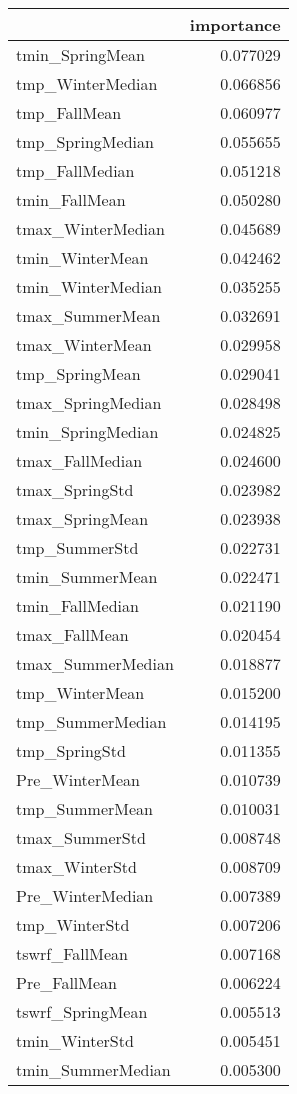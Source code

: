 \begin{tabular}{lr}
\toprule
 & importance \\
\midrule
tmin_SpringMean & 0.077029 \\
tmp_WinterMedian & 0.066856 \\
tmp_FallMean & 0.060977 \\
tmp_SpringMedian & 0.055655 \\
tmp_FallMedian & 0.051218 \\
tmin_FallMean & 0.050280 \\
tmax_WinterMedian & 0.045689 \\
tmin_WinterMean & 0.042462 \\
tmin_WinterMedian & 0.035255 \\
tmax_SummerMean & 0.032691 \\
tmax_WinterMean & 0.029958 \\
tmp_SpringMean & 0.029041 \\
tmax_SpringMedian & 0.028498 \\
tmin_SpringMedian & 0.024825 \\
tmax_FallMedian & 0.024600 \\
tmax_SpringStd & 0.023982 \\
tmax_SpringMean & 0.023938 \\
tmp_SummerStd & 0.022731 \\
tmin_SummerMean & 0.022471 \\
tmin_FallMedian & 0.021190 \\
tmax_FallMean & 0.020454 \\
tmax_SummerMedian & 0.018877 \\
tmp_WinterMean & 0.015200 \\
tmp_SummerMedian & 0.014195 \\
tmp_SpringStd & 0.011355 \\
Pre_WinterMean & 0.010739 \\
tmp_SummerMean & 0.010031 \\
tmax_SummerStd & 0.008748 \\
tmax_WinterStd & 0.008709 \\
Pre_WinterMedian & 0.007389 \\
tmp_WinterStd & 0.007206 \\
tswrf_FallMean & 0.007168 \\
Pre_FallMean & 0.006224 \\
tswrf_SpringMean & 0.005513 \\
tmin_WinterStd & 0.005451 \\
tmin_SummerMedian & 0.005300 \\

\end{tabular}
